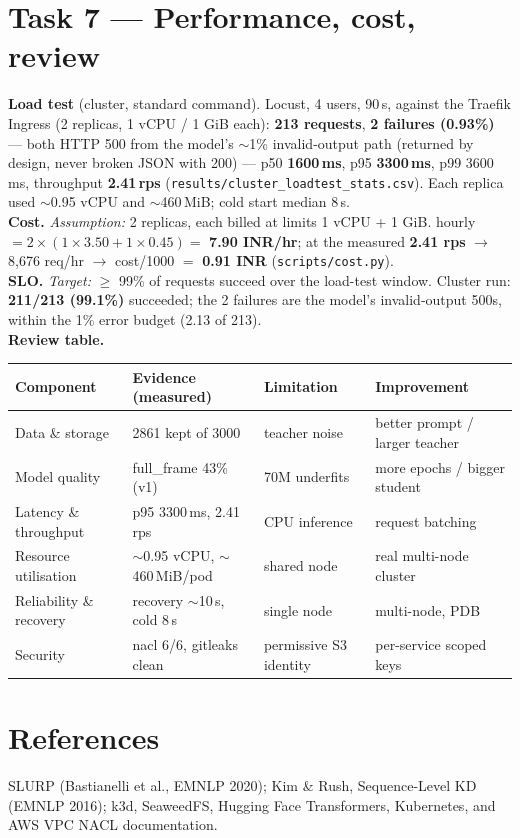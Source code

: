\documentclass[10pt,a4paper]{article}
\newcommand{\code}[1]{\texttt{\small #1}}
\begin{document}
\section{Task 7 --- Performance, cost, review}
\textbf{Load test} (cluster, standard command). Locust, 4 users, 90\,s, against the Traefik Ingress (2
replicas, 1 vCPU / 1 GiB each): \textbf{213 requests}, \textbf{2 failures (0.93\%)} --- both HTTP 500 from
the model's $\sim$1\% invalid-output path (returned by design, never broken JSON with 200) --- p50
\textbf{1600\,ms}, p95 \textbf{3300\,ms}, p99 3600\,ms, throughput \textbf{2.41\,rps}
(\code{results/cluster\_loadtest\_stats.csv}). Each replica used $\sim$0.95 vCPU and $\sim$460\,MiB; cold
start median 8\,s.\\
\textbf{Cost.} \textit{Assumption:} 2 replicas, each billed at limits 1 vCPU + 1 GiB. hourly $= 2 \times
(1{\times}3.50 + 1{\times}0.45) = $ \textbf{7.90 INR/hr}; at the measured \textbf{2.41 rps} $\rightarrow$
8{,}676 req/hr $\rightarrow$ cost/1000 $=$ \textbf{0.91 INR} (\code{scripts/cost.py}).\\
\textbf{SLO.} \textit{Target:} $\geq$ 99\% of requests succeed over the load-test window. Cluster run:
\textbf{211/213 (99.1\%)} succeeded; the 2 failures are the model's invalid-output 500s, within the 1\%
error budget (2.13 of 213).\\
\textbf{Review table.}

\begin{center}\small
\begin{tabular}{p{3.0cm}p{4.3cm}p{3.1cm}p{4.3cm}}
\toprule
Component & Evidence (measured) & Limitation & Improvement \\
\midrule
Data \& storage & 2861 kept of 3000 & teacher noise & better prompt / larger teacher \\
Model quality & full\_frame 43\% (v1) & 70M underfits & more epochs / bigger student \\
Latency \& throughput & p95 3300\,ms, 2.41 rps & CPU inference & request batching \\
Resource utilisation & $\sim$0.95 vCPU, $\sim$460\,MiB/pod & shared node & real multi-node cluster \\
Reliability \& recovery & recovery $\sim$10\,s, cold 8\,s & single node & multi-node, PDB \\
Security & nacl 6/6, gitleaks clean & permissive S3 identity & per-service scoped keys \\
\bottomrule
\end{tabular}
\end{center}

\section{References}
SLURP (Bastianelli et al., EMNLP 2020); Kim \& Rush, Sequence-Level KD (EMNLP 2016); k3d, SeaweedFS, Hugging
Face Transformers, Kubernetes, and AWS VPC NACL documentation.
\end{document}
